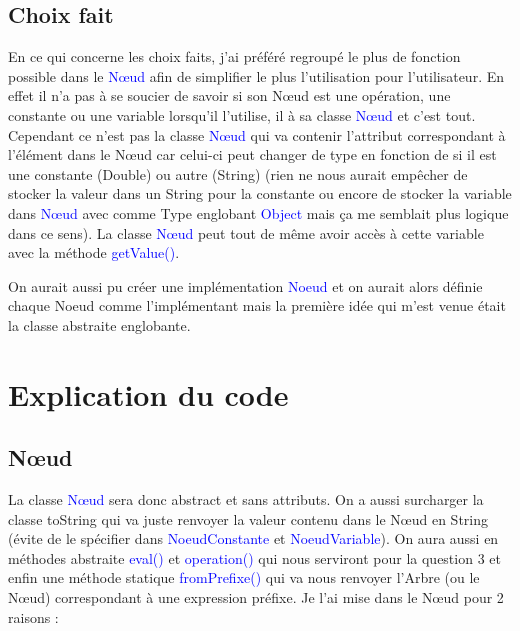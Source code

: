 \documentclass[a4paper]{article}
\renewcommand{\texttt}[2][blue]{\textcolor{#1}{\ttfamily #2}}
\begin{document}
  \subsection{Choix fait}
  \label{subsec:choix_fait}
  \begin{multicols}{2}
    En ce qui concerne les choix faits, j'ai préféré regroupé le plus de fonction possible dans le \texttt{Nœud} afin de simplifier le plus l'utilisation pour l'utilisateur. En effet il n'a pas à se soucier de savoir si son Nœud est une opération, une constante ou une variable lorsqu'il l'utilise, il à sa classe \texttt{Nœud} et c'est tout. Cependant ce n'est pas la classe \texttt{Nœud} qui va contenir l'attribut correspondant à l’élément dans le Nœud car celui-ci peut changer de type en fonction de si il est une constante (Double) ou autre (String) (rien ne nous aurait empêcher de stocker la valeur dans un String pour la constante ou encore de stocker la variable dans \texttt{Nœud} avec comme Type englobant \texttt{Object} mais ça me semblait plus logique dans ce sens). La classe \texttt{Nœud} peut tout de même avoir accès à cette variable avec la méthode \texttt{getValue()}.

    On aurait aussi pu créer une implémentation \texttt{Noeud} et on aurait alors définie chaque Noeud comme l'implémentant mais la première idée qui m'est venue était la classe abstraite englobante.
  \end{multicols}
  
\section{Explication du code}
\label{sec:expli_code}

\subsection{Nœud}
\label{subsec:noeud}

La classe \texttt{Nœud} sera donc abstract et sans attributs. On a aussi surcharger la classe toString qui va juste renvoyer la valeur contenu dans le Nœud en String (évite de le spécifier dans \texttt{NoeudConstante} et \texttt{NoeudVariable}). On aura aussi en méthodes abstraite \texttt{eval()} et \texttt{operation()} qui nous serviront pour la question 3 et enfin une méthode statique \texttt{fromPrefixe()} qui va nous renvoyer l'Arbre (ou le Nœud) correspondant à une expression préfixe. Je l'ai mise dans le Nœud pour 2 raisons :

\vspace{0.5cm}
\end{document}
